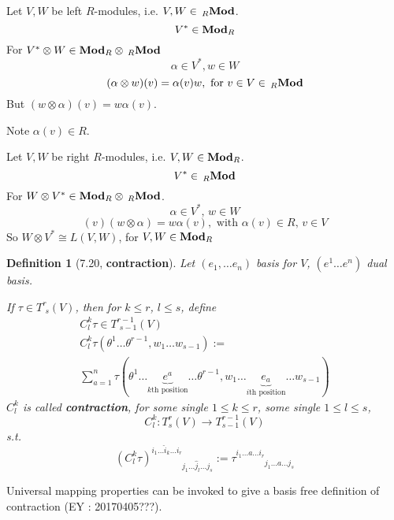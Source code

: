 \documentclass[10pt]{amsart}
\newtheorem{definition}{Definition}
\begin{document}
\begin{multicols*}{2}
Let $V,W$ be left $R$-modules, i.e. $V,W \in {\,}_R\text{\textbf{Mod}}$.  
\[
V^* \in \text{\textbf{Mod}}_R
\]
For $V^*\otimes W \in \text{\textbf{Mod}}_R\otimes {\,}_R\text{\textbf{Mod}}$  
\[
\alpha \in V^*, w\in W
\]
\[
(\alpha \otimes w)(v) = \alpha(v)w, \text{ for } v\in V \in {\,}_R\text{\textbf{Mod}}
\]
But $(w\otimes \alpha)(v) = w\alpha(v)$.  

Note $\alpha(v) \in R$.  

Let $V,W$ be right $R$-modules, i.e. $V,W \in \text{\textbf{Mod}}_R$.  
\[
V^* \in {\,}_R\text{\textbf{Mod}}
\]
For $W\otimes V^* \in \text{\textbf{Mod}}_R \otimes {\,}_R\text{\textbf{Mod}}$.  
\[
\alpha \in V^*, \, w\in W
\]
\[
(v)(w\otimes \alpha) = w\alpha(v), \text{ with } \alpha(v)\in R, \, v\in V
\]
So $W\otimes V^* \cong L(V,W)$, for $V,W\in \text{\textbf{Mod}}_R$

\begin{definition}[7.20\cite{JLee2009}, \textbf{contraction}]
Let $(e_1,\dots e_n)$ basis for $V$, $(e^1\dots e^n)$ dual basis.  

If $\tau \in T^r_{ \,\, s}(V)$, then for $k\leq r$, $l\leq s$, define 
\begin{equation}
\begin{gathered}
	C^k_l \tau \in T^{r-1}_{ \, \, s-1}(V) \\ 
 C^k_l\tau(\theta^1 \dots \theta^{r-1}, w_1\dots w_{s-1}) := \\
	\sum_{a=1}^n \tau(\theta^1 \dots \underbrace{e^a}_{\text{$k$th position} } \dots \theta^{r-1}, w_1 \dots \underbrace{e_a}_{\text{$i$th position}} \dots w_{s-1}  )
\end{gathered}
\end{equation}
$C^k_l$ is called \textbf{contraction}, for some single $1\leq k \leq r$, some single $1\leq l \leq s$, 
\[
C^k_l: T^r_s(V) \to T^{r-1}_{s-1}(V)
\]
s.t.
\[
(C^k_l\tau)^{i_1\dots \widehat{i}_k\dots i_r }_{ \phantom{i_1\dots \widehat{i}_k\dots i_r} j_1\dots \widehat{j}_l \dots j_s} := \tau^{i_1\dots a \dots i_r}_{ \phantom{i_1\dots a \dots i_r} j_1 \dots a \dots j_s }
\]
\end{definition}

Universal mapping properties can be invoked to give a basis free definition of contraction (EY : 20170405???).  


\end{multicols*}
\end{document}
